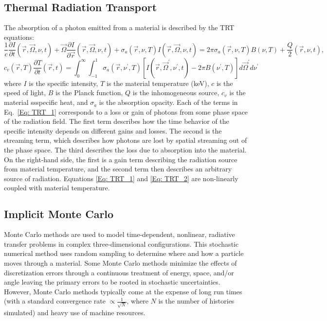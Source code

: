 \subsection{Thermal Radiation Transport}
The absorption of a photon emitted from a material is described by the TRT equations:
\begin{equation} \label{Eq: TRT_1}
\frac{1}{c} \frac{\partial I}{\partial t}(\vec{r}, \vec{\Omega}, \nu, t) + \vec{\Omega} \frac{\partial I}{\partial \vec{r}}(\vec{r}, \vec{\Omega}, \nu, t) + \sigma_{a}(\vec{r}, \nu, T)I(\vec{r}, \vec{\Omega}, \nu, t) = 2 \pi \sigma_{a}(\vec{r}, \nu, T)B(\nu, T) + \frac{Q}{2}(\vec{r}, \nu, t),
\end{equation}
\begin{equation} \label{Eq: TRT_2}
c_{v}(\vec{r}, T) \frac{\partial T}{\partial t}(\vec{r},t) = \int_{0}^{\infty} \int_{-1}^{1} \sigma_{a}(\vec{r}, \nu^{\prime}, T)[I(\vec{r}, \vec{\Omega}^{\prime}, \nu^{\prime}, t) - 2 \pi B(\nu^{\prime}, T)] d \vec{\Omega}^{\prime} d \nu^{\prime}
\end{equation}
where $I$ is the specific intensity, $T$ is the material temperature (keV), $c$ is the speed of light, $B$ is the Planck function, $Q$ is the inhomogeneous source, $c_{v}$ is the material ssspecific heat, and $\sigma_{a}$ is the absorption opacity. Each of the terms in Eq.~\ref{Eq: TRT_1} corresponds to a loss or gain of photons from some phase space of the radiation field. The first term describes how the time behavior of the specific intensity depends on different gains and losses. The second is the streaming term, which describes how photons are lost by spatial streaming out of the phase space. The third describes the loss due to absorption into the material. On the right-hand side, the first is a gain term describing the radiation source from material temperature, and the second term then describes an arbitrary source of radiation. Equations \ref{Eq: TRT_1} and \ref{Eq: TRT_2} are non-linearly coupled with material temperature.

\subsection{Implicit Monte Carlo}
Monte Carlo methods are used to model time-dependent, nonlinear, radiative transfer problems in complex three-dimensional configurations. This stochastic numerical method uses random sampling to determine where and how a particle moves through a material. Some Monte Carlo methods minimize the effects of discretization errors through a continuous treatment of energy, space, and/or angle leaving the primary errors to be rooted in stochastic uncertainties. However, Monte Carlo methods typically come at the expense of long run times (with a standard convergence rate $\propto\frac{1}{\sqrt{N}}$, where $N$ is the number of histories simulated) and heavy use of machine resources.

